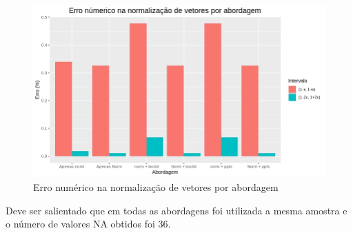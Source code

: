 \documentclass[12pt]{article}
\begin{document}
\begin{figure}[!h]
    \centering
    \includegraphics[width = \linewidth]{../../Figures/report_18_12_06/numerical_error.jpeg}
    \caption{Erro numérico na normalização de vetores por abordagem}
    \label{fig:numerical_error}
\end{figure}
\newpage

Deve ser salientado que em todas as abordagens foi utilizada a mesma amostra e o número de valores NA obtidos foi 36.
\end{document}
